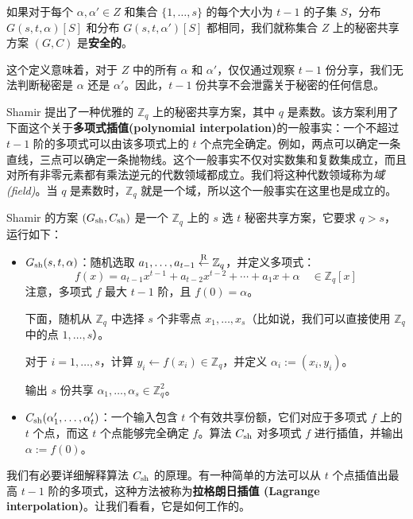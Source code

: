 \begin{definition}\label{def:11-8}
如果对于每个 $\alpha,\alpha' \in Z$ 和集合 $\{1,\dots,s\}$ 的每个大小为 $t-1$ 的子集 $S$，分布 $G(s,t,\alpha)[S]$ 和分布 $G(s,t,\alpha')[S]$ 都相同，我们就称集合 $Z$ 上的秘密共享方案 $(G,C)$ 是\textbf{安全的}。
\end{definition}

这个定义意味着，对于 $Z$ 中的所有 $\alpha$ 和 $\alpha'$，仅仅通过观察 $t-1$ 份分享，我们无法判断秘密是 $\alpha$ 还是 $\alpha'$。因此，$t-1$ 份共享不会泄露关于秘密的任何信息。

\begin{snote}
Shamir 提出了一种优雅的 $\mathbb{Z}_q$ 上的秘密共享方案，其中 $q$ 是素数。该方案利用了下面这个关于\textbf{多项式插值(polynomial interpolation)}的一般事实：一个不超过 $t-1$ 阶的多项式可以由该多项式上的 $t$ 个点完全确定。例如，两点可以确定一条直线，三点可以确定一条抛物线。这个一般事实不仅对实数集和复数集成立，而且对所有非零元素都有乘法逆元的代数领域都成立。我们将这种代数领域称为\emph{域 (field)}。当 $q$ 是素数时，$\mathbb{Z}_q$ 就是一个域，所以这个一般事实在这里也是成立的。

Shamir 的方案 $(G_{\rm sh},C_{\rm sh})$ 是一个 $\mathbb{Z}_q$ 上的 $s$ 选 $t$ 秘密共享方案，它要求 $q>s$，运行如下：
\begin{itemize}
	\item $G_{\rm sh}(s,t,\alpha)$：随机选取 $a_1,\dots,a_{t-1}\overset{\rm R}\leftarrow\mathbb{Z}_q$，并定义多项式：
	\[
	f(x)=a_{t-1}x^{t-1}+a_{t-2}x^{t-2}+\cdots+a_1x+\alpha\quad\in\mathbb{Z}_q[x]
	\]
	注意，多项式 $f$ 最大 $t-1$ 阶，且 $f(0)=\alpha$。
	
	下面，随机从 $\mathbb{Z}_q$ 中选择 $s$ 个非零点 $x_1,\dots,x_s$（比如说，我们可以直接使用 $\mathbb{Z}_q$ 中的点 $1,\dots,s$）。
	
	对于 $i=1,\dots,s$，计算 $y_i\leftarrow f(x_i)\in\mathbb{Z}_q$，并定义 $\alpha_i:=(x_i,y_i)$。
	
	输出 $s$ 份共享 $\alpha_1,\dots,\alpha_s\in\mathbb{Z}_q^2$。
	\item $C_{\rm sh}(\alpha_1',\dots,\alpha_t')$：一个输入包含 $t$ 个有效共享份额，它们对应于多项式 $f$ 上的 $t$ 个点，而这 $t$ 个点能够完全确定 $f$。算法 $C_{\rm sh}$ 对多项式 $f$ 进行插值，并输出 $\alpha:=f(0)$。
\end{itemize}

我们有必要详细解释算法 $C_{\rm sh}$ 的原理。有一种简单的方法可以从 $t$ 个点插值出最高 $t-1$ 阶的多项式，这种方法被称为\textbf{拉格朗日插值 (Lagrange interpolation)}。让我们看看，它是如何工作的。


\end{snote}
